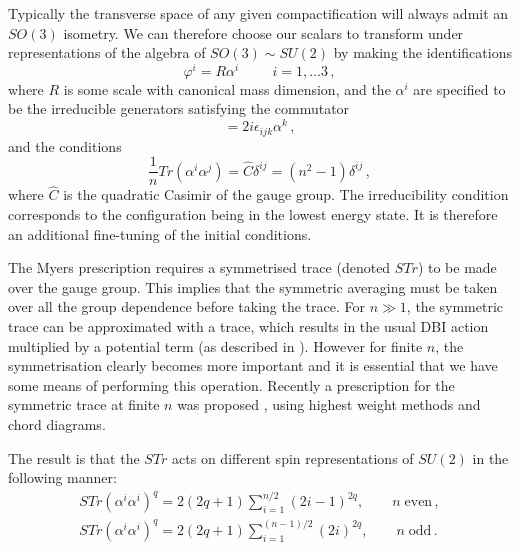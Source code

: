 Typically the transverse space of any given compactification will always admit
an $SO(3)$ isometry. We can therefore choose our scalars to 
transform under representations of the algebra of $SO(3) \sim SU(2)$ by making 
the identifications
% 
\begin{equation}
\varphi^i = R \alpha^i \hspace{1cm} i =1,  \ldots 3 \,,
\end{equation}
% 
where $R$ is some scale with canonical mass dimension, and the $\alpha^i$ are
specified to be the irreducible generators satisfying the commutator
% 
\begin{equation}
[\alpha^i, \alpha^j] = 2i \epsilon_{ijk} \alpha^k \,,
\end{equation}
% 
and the conditions
% 
\begin{equation}
\frac{1}{n} Tr(\alpha^i \alpha^j) = \hat{C} \delta^{ij} = (n^2-1) \delta^{ij}
\,,
\end{equation}
% 
where $\hat{C}$ is the quadratic Casimir of the gauge group.
The irreducibility condition corresponds to the configuration being in the
lowest energy state. It is therefore an additional fine-tuning
of the initial conditions. 


The Myers prescription requires a symmetrised trace (denoted $STr$) to 
be made over the gauge group. This implies that 
the symmetric averaging must be taken over all the group dependence 
before taking the trace. For $n \gg 1$, the symmetric trace can be approximated with a trace, 
which results in the usual DBI action multiplied by a potential term (as
described in \cite{thomasward, Kachru:2002gs}). 
However for finite $n$, the symmetrisation clearly becomes more important and it is essential that
we
have some means of performing this operation. Recently
a prescription for the symmetric trace at finite $n$ was proposed \cite{Ramgoolam:2004gw,
McNamara:2005ry}, 
using highest weight methods and chord diagrams. 


The result is that the $STr$ acts on different spin representations of $SU(2)$ 
in the following manner:
% 
\begin{eqnarray}
STr (\alpha^i \alpha^i)^q = 2(2q+1)\sum_{i=1}^{n/2}(2i-1)^{2q} , 
\qquad n\; \mathrm{ even}\,, 
\\
STr (\alpha^i \alpha^i)^q = 2(2q+1)\sum_{i=1}^{(n-1)/2} (2i)^{2q} , 
\qquad n\; \mathrm{ odd}\,.
\end{eqnarray}
% 


